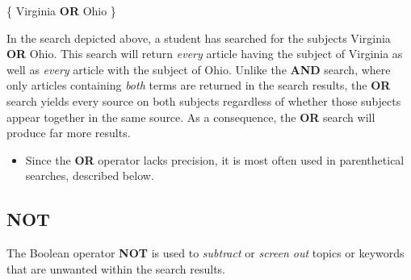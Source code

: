 \begin{center}

\{ Virginia \textbf{OR} Ohio \}
\end{center}


\noindent In the search depicted above, a student has searched for the subjects
Virginia \textbf{OR} Ohio. This search will return \emph{every} article having
the  subject of Virginia as well as \emph{every} article with the subject of
Ohio.  Unlike the \textbf{AND} search, where only articles containing
\emph{both} terms are returned in the search results, the \textbf{OR} search
yields every source on both subjects regardless of whether those subjects
appear together in the same source. As a consequence, the \textbf{OR} search
will produce far more results.

\begin{itemize}\item Since the \textbf{OR} operator lacks precision, it is most
often used in parenthetical searches, described below.\end{itemize}

\subsection{NOT} The Boolean operator \textbf{NOT} is used to \emph{subtract} or
\emph{screen out} topics or keywords that are unwanted within the search
results.


